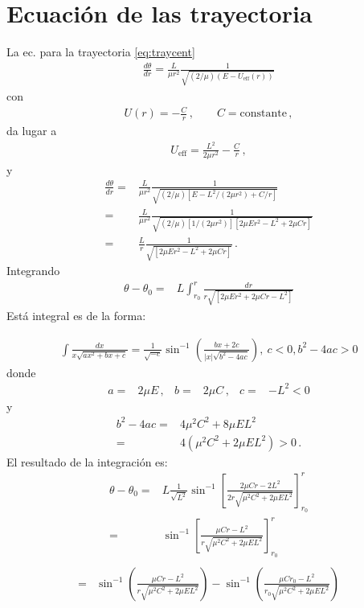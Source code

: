 \section{Ecuación de las trayectoria}
La ec. para la trayectoria \eqref{eq:traycent} 
\begin{align}
  \frac{d\theta}{dr}=\frac{L}{\mu r^2}\frac{1}{\sqrt{({2}/{\mu})\left(E-U_{\text{eff}}(r)\right)}}
\end{align}
con
\begin{align}
  U(r)=-\frac{C}{r}\,,\qquad C=\text{constante}\,,
\end{align}
da lugar a
\begin{align}
  U_{\text{eff}}=\frac{L^2}{2\mu r^2}-\frac{C}{r}\,,
\end{align}
y
\begin{align}
   \frac{d\theta}{dr}=&\frac{L}{\mu r^2}\frac{1}{\sqrt{({2}/{\mu})\left[E-L^2/(2\mu r^2)+C/r\right]}}\nonumber\\
   =&\frac{L}{\mu r^2}\frac{1}{\sqrt{({2}/{\mu})[1/(2\mu r^2)]\left[2\mu Er^2-L^2+2\mu Cr\right]}}\nonumber\\
  =&\frac{L}{r}\frac{1}{\sqrt{\left[2\mu Er^2-L^2+2\mu Cr\right]}}\,.
\end{align}
Integrando
\begin{align}
 \theta-\theta_0  =&L\int_{r_0}^r\frac{dr}{r\sqrt{\left[2\mu Er^2+2\mu Cr-L^2\right]}}
\end{align}
Está integral es de la forma:

\begin{align}
  \int\frac{dx}{x\sqrt{ax^2+bx+c}}=\frac{1}{\sqrt{-c}}\sin^{-1}\left(\frac{bx+2c}{|x|\sqrt{b^2-4ac}}\right), ~ c < 0, b^2-4ac>0
\end{align}
donde
\begin{align}
  a=&2\mu E\,, & b=&2\mu C \,,& c=&-L^2<0
\end{align}
y
\begin{align}
  b^2-4 a c=&4\mu^2 C^2+8\mu E L^2\nonumber\\
           =&4(\mu^2C^2+2\mu E L^2)>0\,.
\end{align}
El resultado de la integración es:
\begin{align}
  \theta-\theta_0=&L\frac{1}{\sqrt{L^2}}
  \sin^{-1}\left[\frac{2\mu C r-2L^2}{2r\sqrt{\mu^2C^2+2\mu E L^2}}\right]_{r_0}^r\nonumber\\
=&\sin^{-1}\left[\frac{\mu C r-L^2}{r\sqrt{\mu^2C^2+2\mu E L^2}}\right]_{r_0}^r\nonumber\\
\end{align}
\begin{align}
   =&\sin^{-1}\left(\frac{\mu C r-L^2}{r\sqrt{\mu^2C^2+2\mu E L^2}}\right)-
   \sin^{-1}\left(\frac{\mu C r_0-L^2}{r_0\sqrt{\mu^2C^2+2\mu E L^2}}\right)
\end{align}

